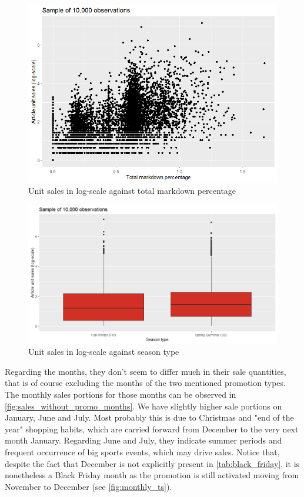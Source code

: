  \begin{figure}[H]
\centering
  \includegraphics[width=0.65\linewidth]{figures/markdown_against_logsales.png}
  \caption{Unit sales in log-scale against total markdown percentage}
  \label{fig:markdown_against_logsales}
\end{figure}



 \begin{figure}[H]
\centering
  \includegraphics[width=0.65\linewidth]{figures/season_type_against_logsales.png}
  \caption{Unit sales in log-scale against season type}
  \label{fig:season_type_against_logsales}
\end{figure}





Regarding the months, they don't seem to differ much in their sale quantities, that is of course excluding the months of the two mentioned promotion types. The monthly sales portions for those months can be observed in \autoref{fig:sales_without_promo_months}. We have slightly higher sale portions on January, June and July. 
Most probably this is due to Christmas and "end of the year" shopping habits, which are carried forward from December to the very next month January. 
Regarding June and July, they indicate summer periods and frequent occurrence of big sports events, which may drive sales. 
Notice that, despite the fact that December is not explicitly present in \autoref{tab:black_friday}, it is nonetheless a Black Friday month as the promotion is still activated moving from November to December (see \autoref{fig:monthly_ts}). 
\\


